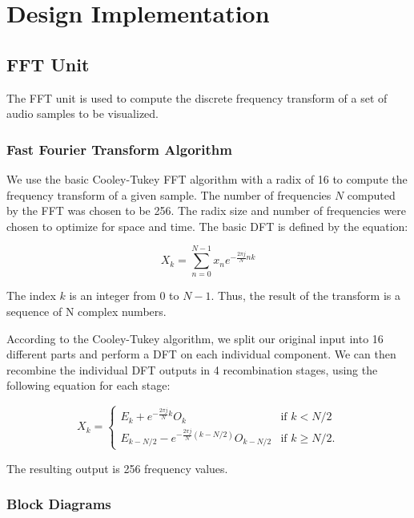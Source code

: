 \documentclass{article}
\begin{document}

\section{Design Implementation}
\subsection{FFT Unit}
The FFT unit is used to compute the discrete frequency transform of a set of audio
samples to be visualized. 

\subsubsection{Fast Fourier Transform Algorithm}
We use the basic Cooley-Tukey FFT algorithm with a radix of 16 to compute the
frequency transform of a given sample. The number of frequencies \(N\) computed by 
the FFT was chosen to be 256. The radix size and number of frequencies were chosen 
to optimize for space and time. The basic DFT is defined by the equation:

\begin{equation}
	X_k = \sum_{n=0}^{N-1} x_n e^{-\frac{2\pi j}{N} nk}
\end{equation}

The index \(k\) is an integer from 0 to \(N - 1\). Thus, the result of the
transform is a sequence of N complex numbers.

According to the Cooley-Tukey algorithm, we split our original input into 
16 different parts and perform a DFT on each individual component. We can then 
recombine the individual DFT outputs in 4 recombination stages, using the 
following equation for each stage: 

\begin{equation}
	X_k = \left\{
	\begin{matrix}
		E_k + e^{-\frac{2\pi j}{N}k} O_k		& 	\mbox{if } k < N/2 \\ 
		E_{k-N/2} - e^{-\frac{2\pi j}{N} (k-N/2)} O_{k-N/2} & 	\mbox{if }
		k \geq N/2. 
	\end{matrix} 
	\right.
\end{equation}

The resulting output is 256 frequency values.

\newpage

\subsubsection{Block Diagrams}
\end{document}
